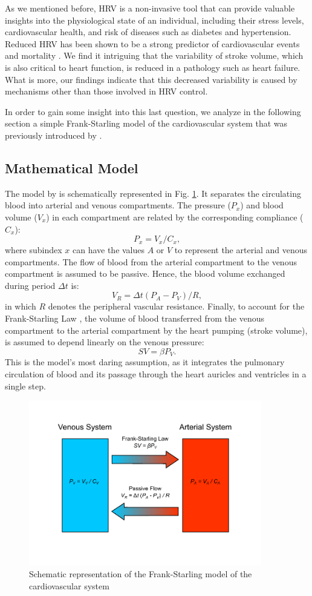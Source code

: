 \documentclass[%
preprint,
 amsmath,amssymb,
 aps,
]{revtex4-2}
\begin{document}
As we mentioned before, HRV is a non-invasive tool that can provide valuable insights into the physiological state of an individual, including their stress levels, cardiovascular health, and risk of diseases such as diabetes and hypertension. Reduced HRV has been shown to be a strong predictor of cardiovascular events and mortality \citep{Zeki_Al_Hazzouri_2014}. We find it intriguing that the variability of stroke volume, which is also critical to heart function, is reduced in a pathology such as heart failure. What is more, our findings indicate that this decreased variability is caused by mechanisms other than those involved in HRV control. 

In order to gain some insight into this last question, we analyze in the following section a simple Frank-Starling model of the cardiovascular system that was previously introduced by \citet{Upton_2005}.

\subsection{Mathematical Model}

The model by \citeauthor{Upton_2005} is schematically represented in Fig. \ref{fig:model}. It separates the circulating blood into arterial and venous compartments. The pressure ($P_x$) and blood volume ($V_x$) in each compartment are related by the corresponding compliance ($C_x$):
\[
    P_x = V_x / C_x,
\] 
where subindex $x$ can have the values $A$ or $V$ to represent the arterial and venous compartments. The flow of blood from the arterial compartment to the venous compartment is assumed to be passive. Hence, the blood volume exchanged during period $\Delta t$ is:
\[
    V_R = \Delta t (P_A - P_V) / R,
\]
in which $R$ denotes the peripheral vascular resistance. Finally, to account for the Frank-Starling Law \citep{Jacob_1992}, the volume of blood transferred from the venous compartment to the arterial compartment by the heart pumping (stroke volume), is assumed to depend linearly on the venous pressure:
\[
    SV = \beta P_V.
\]
This is the model's most daring assumption, as it integrates the pulmonary circulation of blood and its passage through the heart auricles and ventricles in a single step.

\begin{figure}
\includegraphics[width=4in]{model.pdf}
\caption{Schematic representation of the Frank-Starling model of the cardiovascular system}
\label{fig:model}
\end{figure}
\end{document}
